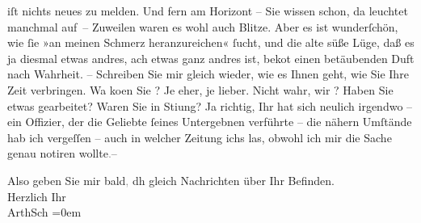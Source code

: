                iſt nichts neues zu melden. Und fern am Horizont – Sie wissen schon, da leuchtet {\pb}\label{K_L02951-2v}\label{K_L02951-2} manchmal
                  auf{\dotstwo} – Zuweilen waren es wohl auch Blitze. Aber es ist
               wunderſchön, wie ſie »an meinen Schmerz heranzureichen« ſucht, und die alte süße
               Lüge, daß es ja diesmal etwas andres, ach etwas ganz andres ist, beko{\geminationm}t {\pb}einen
               betäubenden Duft nach Wahrheit. – Schreiben Sie mir gleich wieder, wie es Ihnen geht,
               wie Sie Ihre Zeit verbringen. Wa{\geminationn} ko{\geminationm}en Sie \label{K_L02951-3v}\label{K_L02951-3}? Je eher, je lieber. Nicht wahr, wir \label{K_L02951-4v}\label{K_L02951-4}? Haben {\pb}Sie etwas gearbeitet? Waren Sie in Sti{\geminationm}ung? Ja richtig, Ihr \label{K_L02951-5v}\label{K_L02951-5} hat sich neulich
               irgendwo \label{K_L02951-6v}\label{K_L02951-6} – ein
               Offizier, der die Geliebte ſeines Untergebnen verführte – die nähern Umſtände hab ich
               vergeſſen – auch {\pb}in welcher Zeitung ichs
               las, obwohl ich mir die Sache genau notiren wollte\textcolor{gray}{.}– \pend
           
\pstart
           Also geben Sie mir bald\textcolor{gray}{,} dh gleich Nachrichten über Ihr
               Befinden. {\\[\baselineskip]}Herzlich Ihr {\\[\baselineskip]}\spacefill\mbox{ArthSch}\pend
           \leftskip=0em{}\endnumbering{}  
      